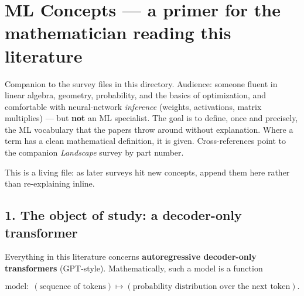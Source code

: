 

\section*{ML Concepts --- a primer for the mathematician reading this literature}

\begin{callout}
Companion to the survey files in this directory. Audience: someone fluent in linear algebra, geometry, probability, and the basics of optimization, and comfortable with neural-network \emph{inference} (weights, activations, matrix multiplies) --- but \textbf{not} an ML specialist. The goal is to define, once and precisely, the ML vocabulary that the papers throw around without explanation. Where a term has a clean mathematical definition, it is given. Cross-references point to the companion \emph{Landscape} survey by part number.

\end{callout}

This is a living file: as later surveys hit new concepts, append them here rather than re-explaining inline.



\subsection*{1. The object of study: a decoder-only transformer}

Everything in this literature concerns \textbf{autoregressive decoder-only transformers} (GPT-style). Mathematically, such a model is a function


\[ \text{model}: \; (\text{sequence of tokens}) \longmapsto (\text{probability distribution over the next token}). \]


